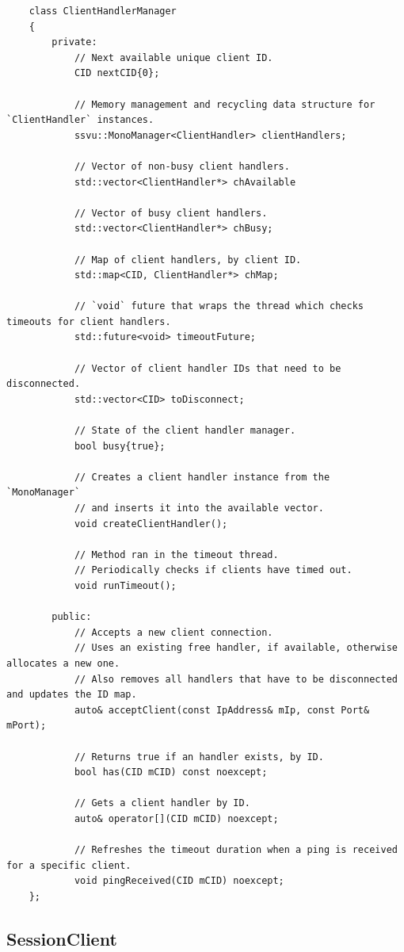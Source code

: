 \documentclass{report}
\def \cppStart {\begin{verbatim}}
\begin{document}
\cppStart
    class ClientHandlerManager
    {
        private:
            // Next available unique client ID. 
            CID nextCID{0};

            // Memory management and recycling data structure for `ClientHandler` instances.
            ssvu::MonoManager<ClientHandler> clientHandlers;

            // Vector of non-busy client handlers.
            std::vector<ClientHandler*> chAvailable
            
            // Vector of busy client handlers.
            std::vector<ClientHandler*> chBusy;
            
            // Map of client handlers, by client ID.
            std::map<CID, ClientHandler*> chMap;

            // `void` future that wraps the thread which checks timeouts for client handlers.
            std::future<void> timeoutFuture;

            // Vector of client handler IDs that need to be disconnected.
            std::vector<CID> toDisconnect;

            // State of the client handler manager.
            bool busy{true};

            // Creates a client handler instance from the `MonoManager`
            // and inserts it into the available vector.
            void createClientHandler();
            
            // Method ran in the timeout thread.
            // Periodically checks if clients have timed out.
            void runTimeout();

        public: 
            // Accepts a new client connection.
            // Uses an existing free handler, if available, otherwise allocates a new one.
            // Also removes all handlers that have to be disconnected and updates the ID map.
            auto& acceptClient(const IpAddress& mIp, const Port& mPort);

            // Returns true if an handler exists, by ID.
            bool has(CID mCID) const noexcept;

            // Gets a client handler by ID.
            auto& operator[](CID mCID) noexcept;

            // Refreshes the timeout duration when a ping is received for a specific client.
            void pingReceived(CID mCID) noexcept;
    };
\end{verbatim}
            
            \subsection{SessionClient}
\end{document}
